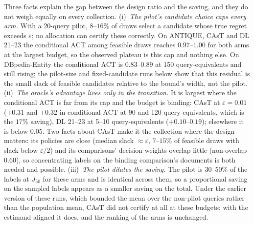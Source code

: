 \documentclass{article}
\newcommand{\eps}{\varepsilon}
\newcommand{\ACT}{\mathrm{ACT}}
\newcommand{\Jfifty}{J_{50}}
\begin{document}
Three facts explain the gap between the design ratio and the saving, and they do not weigh equally on every collection. (i)~\emph{The pilot's candidate choice caps every arm.} With a 20-query pilot, $8$--$16\%$ of draws select a candidate whose true regret exceeds $\eps$; no allocation can certify these correctly. On ANTIQUE, CAsT and DL 21--23 the conditional $\ACT$ among feasible draws reaches $0.97$--$1.00$ for both arms at the largest budget, so the observed plateau is this cap and nothing else. On DBpedia-Entity the conditional $\ACT$ is $0.83$--$0.89$ at 150 query-equivalents and still rising; the pilot-size and fixed-candidate runs below show that this residual is the small slack of feasible candidates relative to the bound's width, not the pilot. (ii)~\emph{The oracle's advantage lives only in the transition.} It is largest where the conditional $\ACT$ is far from its cap and the budget is binding: CAsT at $\eps=0.01$ ($+0.31$ and $+0.32$ in conditional $\ACT$ at 90 and 120 query-equivalents, which is the $17\%$ saving), DL 21--23 at 5--10 query-equivalents ($+0.10$--$0.19$); elsewhere it is below $0.05$. Two facts about CAsT make it the collection where the design matters: its policies are close (median slack $\approx\eps$, $7$--$15\%$ of feasible draws with slack below $\eps/2$) and its comparisons' decision weights overlap little (non-overlap $0.60$), so concentrating labels on the binding comparison's documents is both needed and possible. (iii)~\emph{The pilot dilutes the saving.} The pilot is $30$--$50\%$ of the labels at $\Jfifty$ for these arms and is identical across them, so a proportional saving on the sampled labels appears as a smaller saving on the total. Under the earlier version of these runs, which bounded the mean over the non-pilot queries rather than the population mean, CAsT did not certify at all at these budgets; with the estimand aligned it does, and the ranking of the arms is unchanged.
\end{document}
